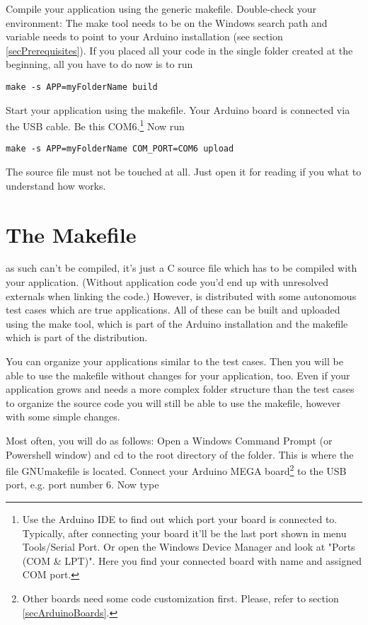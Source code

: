 Compile your application using the generic makefile. Double-check your
environment: The make tool needs to be on the Windows search path and
variable  needs to point to your Arduino installation (see
section \ref{secPrerequisites}). If you placed all your code in the single
folder created at the beginning, all you have to do now is to run

\verb+make -s APP=myFolderName build+

Start your application using the makefile. Your Arduino board is connected
via the USB cable. Be this COM6.\footnote{Use the Arduino IDE to find out
which port your board is connected to. Typically, after connecting your board
it'll be the last port shown in menu Tools/Serial Port. Or open the
Windows Device Manager and look at "Ports (COM \& LPT)". Here you find your
connected board with name and assigned COM port.} Now run

\verb+make -s APP=myFolderName COM_PORT=COM6 upload+

The \rtos{} source file  must not be touched at all. Just open
it for reading if you what to understand how \rtos{} works.


\section{The Makefile}
\label{secMakefile}

\rtos{} as such can't be compiled, it's just a C source file which has to
be compiled with your application. (Without application code you'd end up
with unresolved externals when linking the code.) However, \rtos{} is
distributed with some autonomous test cases which are true \rtos{}
applications. All of these can be built and uploaded using the make tool,
which is part of the Arduino installation and the makefile which is part
of the \rtos{} distribution.

You can organize your applications similar to the test cases. Then you
will be able to use the makefile without changes for your application,
too. Even if your application grows and needs a more complex folder
structure than the test cases to organize the source code you will still
be able to use the makefile, however with some simple changes.

Most often, you will do as follows: Open a Windows Command Prompt (or
Powershell window) and cd to the root directory of the \rtos{} folder.
This is where the file GNUmakefile is located. Connect your Arduino MEGA
board\footnote{Other boards need some code customization first. Please,
refer to section \ref{secArduinoBoards}.} to the USB port, e.g. port
number 6. Now type

